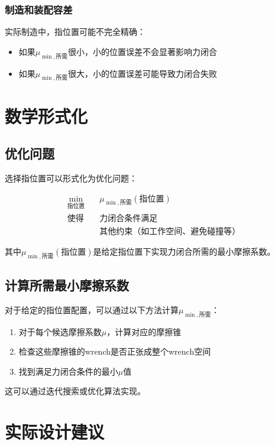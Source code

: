\documentclass[12pt,a4paper]{article}
\begin{document}
\subsubsection{制造和装配容差}

实际制造中，指位置可能不完全精确：
\begin{itemize}
    \item 如果$\mu_{\min,\text{所需}}$很小，小的位置误差不会显著影响力闭合
    \item 如果$\mu_{\min,\text{所需}}$很大，小的位置误差可能导致力闭合失败
\end{itemize}

\section{数学形式化}

\subsection{优化问题}

选择指位置可以形式化为优化问题：

\begin{align}
\min_{\text{指位置}} \quad & \mu_{\min,\text{所需}}(\text{指位置}) \\
\text{使得} \quad & \text{力闭合条件满足} \\
& \text{其他约束（如工作空间、避免碰撞等）}
\end{align}

其中$\mu_{\min,\text{所需}}(\text{指位置})$是给定指位置下实现力闭合所需的最小摩擦系数。

\subsection{计算所需最小摩擦系数}

对于给定的指位置配置，可以通过以下方法计算$\mu_{\min,\text{所需}}$：

\begin{enumerate}
    \item 对于每个候选摩擦系数$\mu$，计算对应的摩擦锥
    \item 检查这些摩擦锥的wrench是否正张成整个wrench空间
    \item 找到满足力闭合条件的最小$\mu$值
\end{enumerate}

这可以通过迭代搜索或优化算法实现。

\section{实际设计建议}
\end{document}
